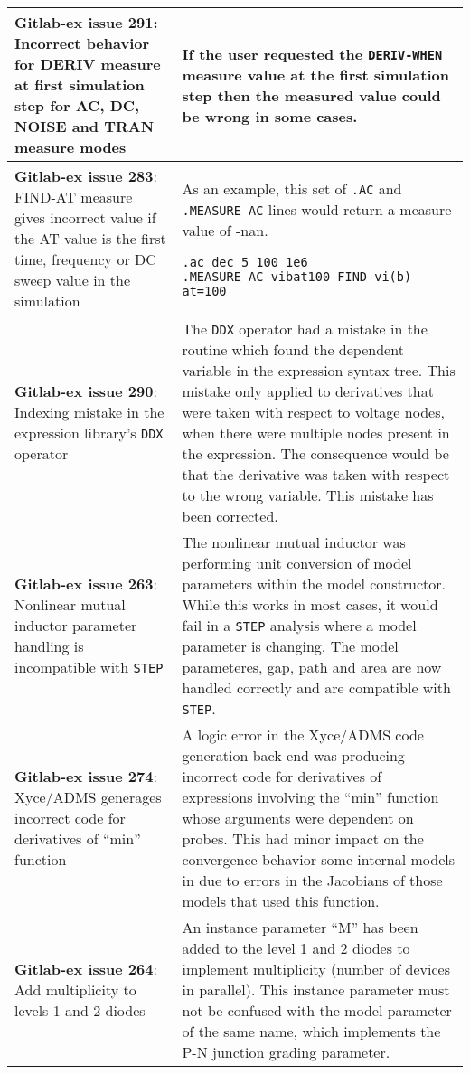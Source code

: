 {\begin{longtable}[h] {>{\raggedright\small}m{2in}|>{\raggedright\let\\\tabularnewline\small}m{3.5in}}
\textbf{Gitlab-ex issue 291}: Incorrect behavior for DERIV measure at first
simulation step for AC, DC, NOISE and TRAN measure modes & If the user
requested the \texttt{DERIV-WHEN} measure value at the first
simulation step then the measured value could be wrong in some
cases. \\ \hline

\textbf{Gitlab-ex issue 283}: FIND-AT measure gives incorrect value if the AT value
is the first time, frequency or DC sweep value in the simulation & As an example,
this set of \texttt{.AC} and \texttt{.MEASURE AC} lines would return a measure
value of -nan.
\begin{verbatim}
.ac dec 5 100 1e6
.MEASURE AC vibat100 FIND vi(b) at=100
\end{verbatim}
\\ \hline

\textbf{Gitlab-ex issue 290}: Indexing mistake in the expression library's \texttt{DDX} operator & 
The \texttt{DDX} operator had a mistake in the routine which found the dependent variable in the 
expression syntax tree.  This mistake only applied to derivatives that were taken with respect to 
voltage nodes, when there were multiple nodes present in the expression.  The consequence would be 
  that the derivative was taken with respect to the wrong variable.  This mistake has been corrected.  \\ \hline

\textbf{Gitlab-ex issue 263}: Nonlinear mutual inductor parameter handling is incompatible with \texttt{STEP} &
The nonlinear mutual inductor was performing unit conversion of model parameters within the model
constructor.  While this works in most cases, it would fail in a \texttt{STEP} analysis where
a model parameter is changing.  The model parameteres, gap, path and area are now handled
correctly and are compatible with \texttt{STEP}. \\ \hline
\textbf{Gitlab-ex issue 274}: Xyce/ADMS generages incorrect code for derivatives of ``min'' function &
A logic error in the Xyce/ADMS code generation back-end was producing
incorrect code for derivatives of expressions involving the ``min''
function whose arguments were dependent on probes.  This had minor
impact on the convergence behavior some internal models in \Xyce{} due
to errors in the Jacobians of those models that used this
function.  \\ \hline
\textbf{Gitlab-ex issue 264}: Add multiplicity to levels 1 and 2 diodes &
 An instance parameter ``M'' has been added to the level 1 and 2
diodes to implement multiplicity (number of devices in parallel).
This instance parameter must not be confused with the model parameter
of the same name, which implements the P-N junction grading
parameter. \\ \hline


\end{longtable}}
